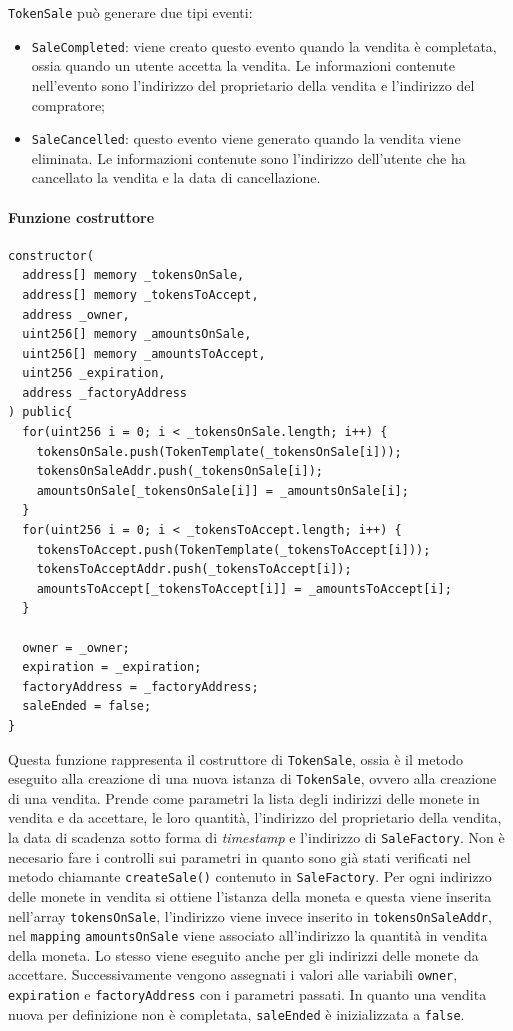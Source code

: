 \documentclass[a4paper]{article}
\begin{document}
        \verb|TokenSale| può generare due tipi eventi:
        \begin{itemize}
          \item \verb|SaleCompleted|: viene creato questo evento quando la vendita è completata, ossia quando un utente accetta la vendita. Le informazioni contenute nell'evento sono l'indirizzo del proprietario della vendita e l'indirizzo del compratore;
          \item \verb|SaleCancelled|: questo evento viene generato quando la vendita viene eliminata. Le informazioni contenute sono l'indirizzo dell'utente che ha cancellato la vendita e la data di cancellazione.
        \end{itemize}
        \paragraph{Funzione costruttore}
\begin{lstlisting}[style=ES6, title={Funzione costruttore di TokenSale}]
constructor(
  address[] memory _tokensOnSale,
  address[] memory _tokensToAccept,
  address _owner,
  uint256[] memory _amountsOnSale,
  uint256[] memory _amountsToAccept,
  uint256 _expiration,
  address _factoryAddress
) public{
  for(uint256 i = 0; i < _tokensOnSale.length; i++) {
    tokensOnSale.push(TokenTemplate(_tokensOnSale[i]));
    tokensOnSaleAddr.push(_tokensOnSale[i]);
    amountsOnSale[_tokensOnSale[i]] = _amountsOnSale[i];
  }
  for(uint256 i = 0; i < _tokensToAccept.length; i++) {
    tokensToAccept.push(TokenTemplate(_tokensToAccept[i]));
    tokensToAcceptAddr.push(_tokensToAccept[i]);
    amountsToAccept[_tokensToAccept[i]] = _amountsToAccept[i];
  }

  owner = _owner;
  expiration = _expiration;
  factoryAddress = _factoryAddress;
  saleEnded = false;
}\end{lstlisting}
        Questa funzione rappresenta il costruttore di \verb|TokenSale|, ossia è il metodo eseguito alla creazione di una nuova istanza di \verb|TokenSale|, ovvero alla creazione di una vendita.
        Prende come parametri la lista degli indirizzi delle monete in vendita e da accettare, le loro quantità, l'indirizzo del proprietario della vendita, la data di scadenza sotto forma di \emph{timestamp}
        e l'indirizzo di \verb|SaleFactory|. Non è necesario fare i controlli sui parametri in quanto sono già stati verificati nel metodo chiamante \verb|createSale()| contenuto in \verb|SaleFactory|.
        Per ogni indirizzo delle monete in vendita si ottiene l'istanza della moneta e questa viene inserita nell'array \verb|tokensOnSale|, l'indirizzo viene invece inserito in \verb|tokensOnSaleAddr|, nel \verb|mapping| \verb|amountsOnSale|
        viene associato all'indirizzo la quantità in vendita della moneta. Lo stesso viene eseguito anche per gli indirizzi delle monete da accettare. Successivamente vengono assegnati i valori alle variabili \verb|owner|, \verb|expiration| e \verb|factoryAddress| con i parametri passati.
        In quanto una vendita nuova per definizione non è completata, \verb|saleEnded| è inizializzata a \verb|false|.
\end{document}

